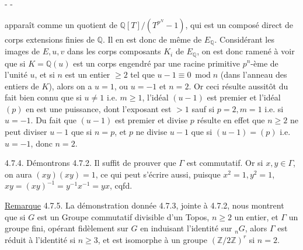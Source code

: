 \begin{center}-  -\end{center}

apparaît comme un quotient de $\mathbb Q[T]/(T^{p^N}-1)$, qui est un composé direct de corps extensions finies de $\mathbb Q$. Il en est donc de même de $E_{\mathbb Q}$. Considérant les images de $E,u,v$ dans les corps composants $K_i$ de $E_{\mathbb Q}$, on est donc ramené à voir que si $K=\mathbb Q(u)$ est un corps engendré par une racine primitive $p^n$-ème de l'unité $u$, et si $n$ est un entier $\geq2$ tel que $u-1\equiv0\ \operatorname{mod}n$ (dans l'anneau des entiers de $K$), alors on a $u=1$, ou $u=-1$ et $n=2$. Or ceci résulte aussitôt du fait bien connu que si $u\neq1$ i.e. $m\geq1$, l'idéal $(u-1)$ est premier et l'idéal $(p)$ en est une puissance, dont l'exposant est $>1$ sauf si $p=2,m=1$ i.e. si $u=-1$. Du fait que $(u-1)$ est premier et divise $p$ résulte en effet que $n\geq2$ ne peut diviser $u-1$ que si $n=p$, et $p$ ne divise $u-1$ que si $(u-1)=(p)$ i.e. $u=-1$, donc $n=2$.

4.7.4. Démontrons 4.7.2. Il suffit de prouver que $\Gamma$ est commutatif. Or si $x,y\in\Gamma$, on aura $(xy)(xy)=1$, ce qui peut s'écrire aussi, puisque $x^2=1,y^2=1$, $xy=(xy)^{-1}=y^{-1}x^{-1}=yx$, cqfd.

\uline{Remarque} 4.7.5. La démonstration donnée 4.7.3, jointe à 4.7.2, nous montrent que si $G$ est un Groupe commutatif divisible d'un Topos, $n\geq2$ un entier, et $\Gamma$ un groupe fini, opérant fidèlement sur $G$ en induisant l'identité sur ${}_nG$, alors $\Gamma$ est réduit à l'identité si $n\geq3$, et est isomorphe à un groupe $(\mathbb Z/2\mathbb Z)^r$ si $n=2$.
